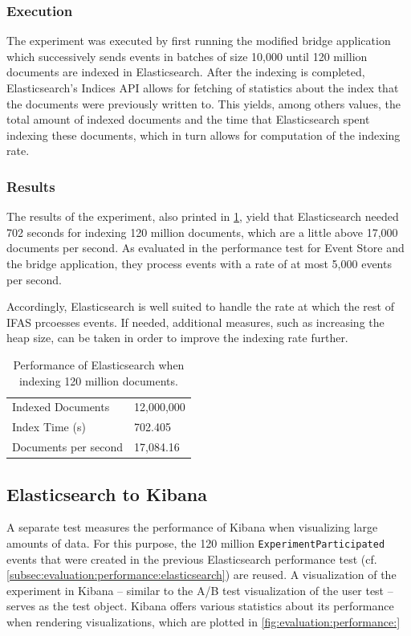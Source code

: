 \subsubsection{Execution}

The experiment was executed by first running the modified bridge application which successively sends events in batches of size 10,000 until 120 million documents are indexed in Elasticsearch.
After the indexing is completed, Elasticsearch's Indices API allows for fetching of statistics about the index that the documents were previously written to.
This yields, among others values, the total amount of indexed documents and the time that Elasticsearch spent indexing these documents, which in turn allows for computation of the indexing rate.

\subsubsection{Results}

The results of the experiment, also printed in \cref{table:elasticsearch-performance}, yield that Elasticsearch needed 702 seconds for indexing 120 million documents, which are a little above 17,000 documents per second.
As evaluated in the performance test for Event Store and the bridge application, they process events with a rate of at most 5,000 events per second.

Accordingly, Elasticsearch is well suited to handle the rate at which the rest of \ac{IFAS} prcoesses events.
If needed, additional measures, such as increasing the heap size, can be taken in order to improve the indexing rate further.

\begin{table}
\caption{Performance of Elasticsearch when indexing 120 million documents.}
\label{table:elasticsearch-performance}
\centering
\begin{tabular}{ll}
Indexed Documents & 12,000,000 \\
Index Time (s) & 702.405 \\
Documents per second & 17,084.16
\end{tabular}
\end{table}

\subsection{Elasticsearch to Kibana}
\label{subsec:evaluation:performance:kibana}

A separate test measures the performance of Kibana when visualizing large amounts of data.
For this purpose, the 120 million \texttt{ExperimentParticipated} events that were created in the previous Elasticsearch performance test (cf. \cref{subsec:evaluation:performance:elasticsearch}) are reused.
A visualization of the experiment in Kibana -- similar to the A/B test visualization of the user test -- serves as the test object.
Kibana offers various statistics about its performance when rendering visualizations, which are plotted in \cref{fig:evaluation:performance:}


